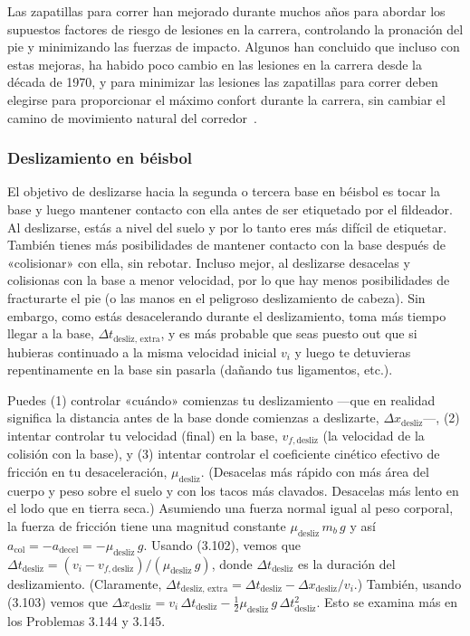 \documentclass[12pt]{book}
\begin{document}
Las zapatillas para correr han mejorado durante muchos años para abordar los supuestos factores de riesgo de lesiones en la carrera, controlando la pronación del pie y minimizando las fuerzas de impacto. Algunos han concluido que incluso con estas mejoras, ha habido poco cambio en las lesiones en la carrera desde la década de 1970, y para minimizar las lesiones las zapatillas para correr deben elegirse para proporcionar el máximo confort durante la carrera, sin cambiar el camino de movimiento natural del corredor~\cite{ref111}.

\subsubsection*{Deslizamiento en béisbol}

El objetivo de deslizarse hacia la segunda o tercera base en béisbol es tocar la base y luego mantener contacto con ella antes de ser etiquetado por el fildeador. Al deslizarse, estás a nivel del suelo y por lo tanto eres más difícil de etiquetar. También tienes más posibilidades de mantener contacto con la base después de «colisionar» con ella, sin rebotar. Incluso mejor, al deslizarse desacelas y colisionas con la base a menor velocidad, por lo que hay menos posibilidades de fracturarte el pie (o las manos en el peligroso deslizamiento de cabeza). Sin embargo, como estás desacelerando durante el deslizamiento, toma más tiempo llegar a la base, $\Delta t_{\text{desliz, extra}}$, y es más probable que seas puesto out que si hubieras continuado a la misma velocidad inicial $v_i$ y luego te detuvieras repentinamente en la base sin pasarla (dañando tus ligamentos, etc.).

Puedes (1) controlar «cuándo» comienzas tu deslizamiento ---que en realidad significa la distancia antes de la base donde comienzas a deslizarte, $\Delta x_{\text{desliz}}$---, (2) intentar controlar tu velocidad (final) en la base, $v_{f,\text{desliz}}$ (la velocidad de la colisión con la base), y (3) intentar controlar el coeficiente cinético efectivo de fricción en tu desaceleración, $\mu_{\text{desliz}}$. (Desacelas más rápido con más área del cuerpo y peso sobre el suelo y con los tacos más clavados. Desacelas más lento en el lodo que en tierra seca.) Asumiendo una fuerza normal igual al peso corporal, la fuerza de fricción tiene una magnitud constante $\mu_{\text{desliz}}\,m_b\,g$ y así $a_{\text{col}} = -a_{\text{decel}} = -\mu_{\text{desliz}}\,g$. Usando (3.102), vemos que $\Delta t_{\text{desliz}} = (v_i - v_{f,\text{desliz}})/(\mu_{\text{desliz}}\,g)$, donde $\Delta t_{\text{desliz}}$ es la duración del deslizamiento. (Claramente, $\Delta t_{\text{desliz, extra}} = \Delta t_{\text{desliz}} - \Delta x_{\text{desliz}}/v_i$.) También, usando (3.103) vemos que $\Delta x_{\text{desliz}} = v_i\,\Delta t_{\text{desliz}} - \frac{1}{2}\mu_{\text{desliz}}\,g\,\Delta t_{\text{desliz}}^2$. Esto se examina más en los Problemas 3.144 y 3.145.
\end{document}
